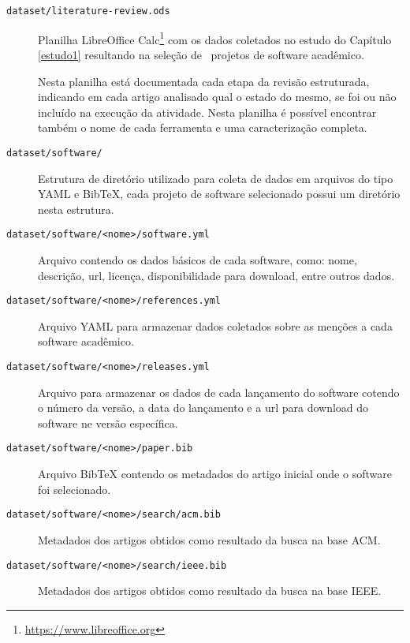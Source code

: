 \begin{description}

  \item [\texttt{dataset/literature-review.ods}]
    Planilha LibreOffice Calc\footnote{\url{https://www.libreoffice.org}} com
    os dados coletados no estudo do Capítulo \ref{estudo1} resultando na
    seleção de \SoftwareCount \ projetos de software acadêmico.

Nesta planilha está documentada cada etapa da revisão estruturada, indicando em
cada artigo analisado qual o estado do mesmo, se foi ou não incluído na
execução da atividade.  Nesta planilha é possível encontrar também o nome de
cada ferramenta e uma caracterização completa.

  \item [\texttt{dataset/software/}]
    Estrutura de diretório utilizado para coleta de dados em arquivos do tipo
    YAML e BibTeX, cada projeto de software selecionado possui um diretório
    nesta estrutura.

  \item [\texttt{dataset/software/<nome>/software.yml}]
    Arquivo contendo os dados básicos de cada software, como: nome, descrição, url,
    licença, disponibilidade para download, entre outros dados.

  \item [\texttt{dataset/software/<nome>/references.yml}]
    Arquivo YAML para armazenar dados coletados sobre as menções a cada software
    acadêmico.

  \item [\texttt{dataset/software/<nome>/releases.yml}]
    Arquivo para armazenar os dados de cada lançamento do software cotendo o
    número da versão, a data do lançamento e a url para download do software
    ne versão específica.

  \item [\texttt{dataset/software/<nome>/paper.bib}]
    Arquivo BibTeX contendo os metadados do artigo inicial onde o software foi
    selecionado.

  \item [\texttt{dataset/software/<nome>/search/acm.bib}]
    Metadados dos artigos obtidos como resultado da busca na base ACM.

  \item [\texttt{dataset/software/<nome>/search/ieee.bib}]
    Metadados dos artigos obtidos como resultado da busca na base IEEE.

\end{description}

